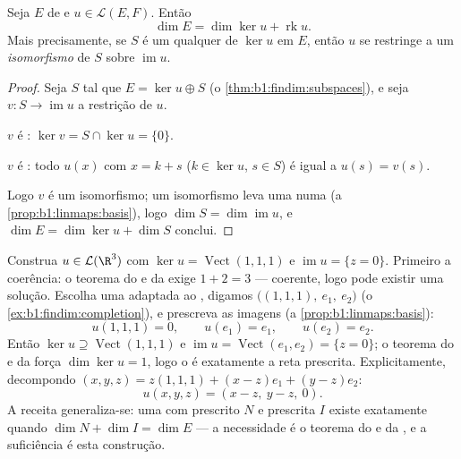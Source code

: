 \begin{theorem}\label{thm:b1:linmaps:ranknullity}
Seja $E$ de  e $u \in \mathcal{L}(E, F)$.
Então
\[
\dim E = \dim \ker u + \operatorname{rk} u .
\]
Mais precisamente, se $S$ é um   qualquer de
$\ker u$ em $E$, então $u$ se restringe a um \emph{isomorfismo} de
$S$ sobre $\operatorname{im} u$.
\end{theorem}

\begin{proof}
Seja $S$ tal que $E = \ker u \oplus S$ (o \cref{thm:b1:findim:subspaces}), e seja $v \colon S \to
\operatorname{im} u$ a restrição de $u$.

$v$ é : $\ker v = S \cap \ker u = \{0\}$.

$v$ é : todo $u(x)$ com $x = k + s$ ($k \in \ker u$, $s \in S$) é igual
a $u(s) = v(s)$.

Logo $v$ é um isomorfismo; um isomorfismo leva uma  numa 
(a \cref{prop:b1:linmaps:basis}), logo $\dim S = \dim\operatorname{im}
u$, e $\dim E = \dim\ker u + \dim S$ conclui.
\end{proof}

\begin{example}
\label{ex:b1:linmaps:tospec}
Construa $u \in \mathcal{L}(\R^3)$ com $\ker u =
\operatorname{Vect}(1,1,1)$ e $\operatorname{im} u = \{z =
0\}$. Primeiro a coerência: o teorema
do  e da  exige $1 + 2 = 3$ --- coerente, logo pode existir
uma solução. Escolha uma  adaptada ao , digamos $\bigl((1,1,1),\ e_1,\ e_2\bigr)$
(o \cref{ex:b1:findim:completion}), e prescreva as imagens (a \cref{prop:b1:linmaps:basis}):
\[
u(1,1,1) = 0, \qquad u(e_1) = e_1, \qquad u(e_2) = e_2 .
\]
Então $\ker u \supseteq \operatorname{Vect}(1,1,1)$ e $\operatorname{im} u = \operatorname{Vect}(e_1, e_2) = \{z =
0\}$; o teorema do  e da  força $\dim\ker u = 1$,
logo o  é exatamente a reta prescrita. Explicitamente,
decompondo $(x, y, z)
= z(1,1,1) + (x - z)e_1 + (y - z)e_2$:
\[
u(x, y, z) = (x - z,\ y - z,\ 0).
\]
A receita generaliza-se: uma  com  prescrito
$N$ e  prescrita $I$ existe exatamente quando $\dim N + \dim I = \dim E$ --- a
necessidade é o teorema do  e da , e a suficiência é
esta construção.
\end{example}

